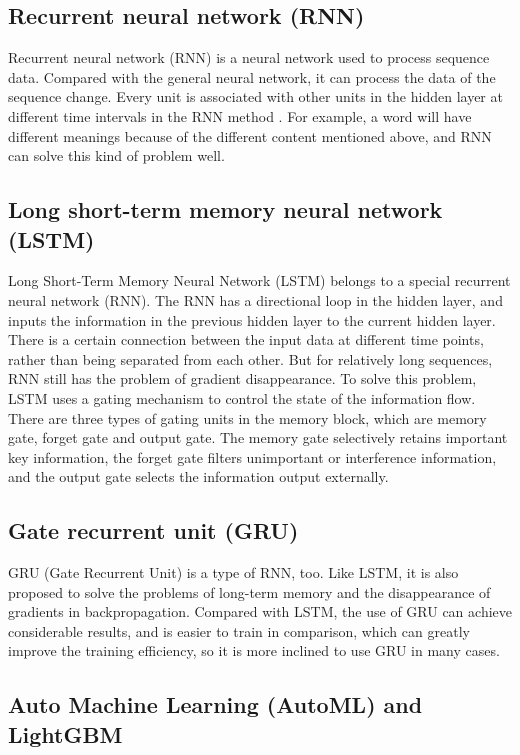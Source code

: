\documentclass[a4paper,fleqn]{cas-sc}
\begin{document}
\subsection{Recurrent neural network (RNN)}

Recurrent neural network (RNN) is a neural network used to process sequence data. 
Compared with the general neural network, it can process the data of the sequence change. 
Every unit is associated with other units in the hidden layer at different time intervals in the RNN method \citep{Wang2020}.
For example, a word will have different meanings because of the different content mentioned above, and RNN can solve this kind of problem well.

\subsection{Long short-term memory neural network (LSTM)}

Long Short-Term Memory Neural Network (LSTM) belongs to a special recurrent neural network (RNN).
The RNN has a directional loop in the hidden layer, and inputs the information in the previous hidden layer to the current hidden layer. 
There is a certain connection between the input data at different time points, rather than being separated from each other. 
But for relatively long sequences, RNN still has the problem of gradient disappearance. 
To solve this problem, LSTM uses a gating mechanism to control the state of the information flow. 
There are three types of gating units in the memory block, which are memory gate, forget gate and output gate. 
The memory gate selectively retains important key information, the forget gate filters unimportant or interference information, and the output gate selects the information output externally.

\subsection{Gate recurrent unit (GRU)}

GRU (Gate Recurrent Unit) is a type of RNN, too. 
Like LSTM, it is also proposed to solve the problems of long-term memory and the disappearance of gradients in backpropagation.
Compared with LSTM, the use of GRU can achieve considerable results, and is easier to train in comparison, which can greatly improve the training efficiency, so it is more inclined to use GRU in many cases.

\subsection{Auto Machine Learning (AutoML) and LightGBM}
\end{document}
